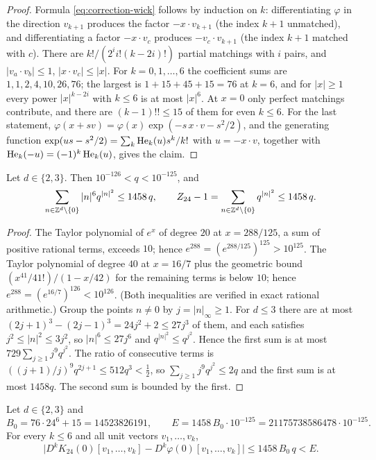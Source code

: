 \begin{proof}
Formula \eqref{eq:correction-wick} follows by induction on $k$: differentiating $\varphi$ in the direction $v_{k+1}$ produces the factor $-x\cdot v_{k+1}$ (the index $k+1$ unmatched), and differentiating a factor $-x\cdot v_c$ produces $-v_c\cdot v_{k+1}$ (the index $k+1$ matched with $c$). There are $k!/(2^ii!(k-2i)!)$ partial matchings with $i$ pairs, and $|v_a\cdot v_b|\le1$, $|x\cdot v_c|\le|x|$. For $k=0,1,\dots,6$ the coefficient sums are $1,1,2,4,10,26,76$; the largest is $1+15+45+15=76$ at $k=6$, and for $|x|\ge1$ every power $|x|^{k-2i}$ with $k\le6$ is at most $|x|^6$. At $x=0$ only perfect matchings contribute, and there are $(k-1)!!\le15$ of them for even $k\le6$. For the last statement, $\varphi(x+sv)=\varphi(x)\exp(-s\,x\cdot v-s^2/2)$, and the generating function $\exp(us-s^2/2)=\sum_k\operatorname{He}_k(u)s^k/k!$ with $u=-x\cdot v$, together with $\operatorname{He}_k(-u)=(-1)^k\operatorname{He}_k(u)$, gives the claim.
\end{proof}

\begin{lemma}\label{lem:correction-lattice}
Let $d\in\{2,3\}$. Then $10^{-126}<q<10^{-125}$, and
\begin{equation}\label{eq:correction-lattice}
\sum_{n\in\mathbb Z^d\setminus\{0\}}|n|^6q^{|n|^2}\le1458\,q,\qquad Z_{24}-1=\sum_{n\in\mathbb Z^d\setminus\{0\}}q^{|n|^2}\le1458\,q .
\end{equation}
\end{lemma}

\begin{proof}
The Taylor polynomial of $e^x$ of degree $20$ at $x=288/125$, a sum of positive rational terms, exceeds $10$; hence $e^{288}=(e^{288/125})^{125}>10^{125}$. The Taylor polynomial of degree $40$ at $x=16/7$ plus the geometric bound $(x^{41}/41!)/(1-x/42)$ for the remaining terms is below $10$; hence $e^{288}=(e^{16/7})^{126}<10^{126}$. (Both inequalities are verified in exact rational arithmetic.) Group the points $n\ne0$ by $j=|n|_\infty\ge1$. For $d\le3$ there are at most $(2j+1)^3-(2j-1)^3=24j^2+2\le27j^3$ of them, and each satisfies $j^2\le|n|^2\le3j^2$, so $|n|^6\le27j^6$ and $q^{|n|^2}\le q^{j^2}$. Hence the first sum is at most $729\sum_{j\ge1}j^9q^{j^2}$. The ratio of consecutive terms is $((j+1)/j)^9q^{2j+1}\le512q^3<\frac12$, so $\sum_{j\ge1}j^9q^{j^2}\le2q$ and the first sum is at most $1458q$. The second sum is bounded by the first.
\end{proof}

\begin{lemma}\label{lem:correction-jet}
Let $d\in\{2,3\}$ and
\begin{equation}\label{eq:correction-E}
B_0=76\cdot24^6+15=14523826191,\qquad E=1458\,B_0\cdot10^{-125}=21175738586478\cdot10^{-125}.
\end{equation}
For every $k\le6$ and all unit vectors $v_1,\dots,v_k$,
\begin{equation}\label{eq:correction-jetbound}
\bigl|D^kK_{24}(0)[v_1,\dots,v_k]-D^k\varphi(0)[v_1,\dots,v_k]\bigr|\le1458\,B_0\,q<E .
\end{equation}
\end{lemma}

